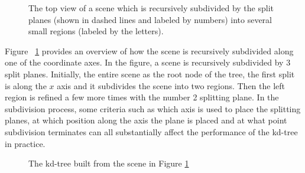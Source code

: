 \begin{figure}[H] 
	\centering
	\renewcommand{\thefigure}{\thechapter.\arabic{figure}}
	\caption[2D view of the subdivision of a scene]{The top view of a scene which is recursively subdivided by the split planes (shown in dashed lines and labeled by numbers) into several small regions (labeled by the letters).}
	\label{fig:kd-tree_subdivide} 
\end{figure}

Figure ~\ref{fig:kd-tree_subdivide} provides an overview of how the scene is recursively subdivided along one of the coordinate axes. In the figure, a scene is recursively subdivided by 3 split planes. Initially, the entire scene as the root node of the tree, the first split is along the \(x\) axis and it subdivides the scene into two regions. Then the left region is refined a few more times with the number 2 splitting plane. In the subdivision process, some criteria such as which axis is used to place the splitting planes,  at which position along the axis the plane is placed and at what point subdivision terminates can all substantially affect the performance of the kd-tree in practice.  


\begin{figure}[H]
	\centering
	\renewcommand{\thefigure}{\thechapter.\arabic{figure}}
	\caption[KD-Tree representation of a simple scene]{The kd-tree built from the scene in Figure \ref{fig:kd-tree_subdivide}}
	\label{fig:kd-tree_subdivide_tree} 
\end{figure}


